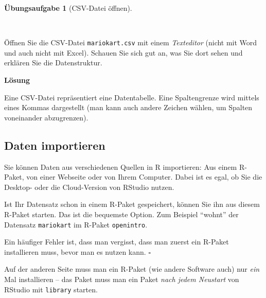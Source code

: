\documentclass[
  letterpaper,
  oneside,
  open=any]{scrbook}
\theoremstyle{definition}
\newtheorem{exercise}{Übungsaufgabe}[chapter]
\theoremstyle{definition}
\theoremstyle{definition}
\theoremstyle{remark}
\begin{document}
\begin{exercise}[CSV-Datei
öffnen]\protect\hypertarget{exr-csv}{}\label{exr-csv}

~

Öffnen Sie die CSV-Datei \texttt{mariokart.csv} mit einem
\emph{Texteditor} (nicht mit Word und auch nicht mit Excel). Schauen Sie
sich gut an, was Sie dort sehen und erklären Sie die Datenstruktur.

\textbf{Lösung}

Eine CSV-Datei repräsentiert eine Datentabelle. Eine Spaltengrenze wird
mittels eines Kommas dargestellt (man kann auch andere Zeichen wählen,
um Spalten voneinander abzugrenzen).

\end{exercise}

\subsection{Daten importieren}\label{sec-import-mariokart}

Sie können Daten aus verschiedenen Quellen in R importieren: Aus einem
R-Paket, von einer Webseite oder von Ihrem Computer. Dabei ist es egal,
ob Sie die Desktop- oder die Cloud-Version von RStudio nutzen.

Ist Ihr Datensatz schon in einem R-Paket gespeichert, können Sie ihn aus
diesem R-Paket starten. Das ist die bequemste Option. Zum Beispiel
\enquote{wohnt} der Datensatz \texttt{mariokart} im R-Paket
\texttt{openintro}.

\begin{tcolorbox}[enhanced jigsaw, bottomrule=.15mm, left=2mm, colbacktitle=quarto-callout-tip-color!10!white, bottomtitle=1mm, colframe=quarto-callout-tip-color-frame, coltitle=black, rightrule=.15mm, breakable, toptitle=1mm, titlerule=0mm, title=\textcolor{quarto-callout-tip-color}{\faLightbulb}\hspace{0.5em}{Tipp}, opacitybacktitle=0.6, arc=.35mm, colback=white, leftrule=.75mm, opacityback=0, toprule=.15mm]

Ein häufiger Fehler ist, dass man vergisst, dass man zuerst ein R-Paket
installieren muss, bevor man es nutzen kann. \(\square\)

\end{tcolorbox}

Auf der anderen Seite muss man ein R-Paket (wie andere Software auch)
nur \emph{ein} Mal installieren -- das Paket muss man ein Paket
\emph{nach jedem Neustart} von RStudio mit \texttt{library} starten.
\end{document}
